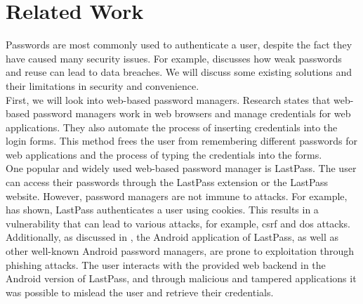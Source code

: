 \section{Related Work} \label{relwork}
Passwords are most commonly used to authenticate a user, despite the fact they have caused many security issues. For example, \cite{WeakPasswords} discusses how weak passwords and reuse can lead to data breaches. We will discuss some existing solutions and their limitations in security and convenience. \\

First, we will look into web-based password managers. Research \cite{LiHAS14} states that web-based password managers work in web browsers and manage credentials for web applications. They also automate the process of inserting credentials into the login forms. This method frees the user from remembering different passwords for web applications and the process of typing the credentials into the forms. \\
One popular and widely used web-based password manager is LastPass. The user can access their passwords through the LastPass extension or the LastPass website. However, password managers are not immune to attacks. For example, \cite{LiHAS14} has shown, LastPass authenticates a user using cookies. This results in a vulnerability that can lead to various attacks, for example, \gls{csrf} and \gls{dos} attacks. Additionally, as discussed in \cite{AndroidPhishing}, the Android application of LastPass, as well as other well-known Android password managers, are prone to exploitation through phishing attacks. The user interacts with the provided web backend in the Android version of LastPass, and through malicious and tampered applications it was possible to mislead the user and retrieve their credentials. \\

